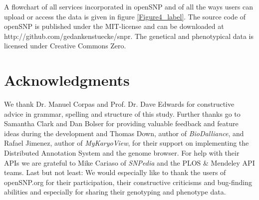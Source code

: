 \documentclass[10pt]{article}
\begin{document}
A flowchart of all services incorporated in openSNP and of all the ways users can upload or access the data is given in figure \ref{Figure4_label}. The source code of openSNP is 
published under the MIT-license and can be downloaded at http://github.com/gedankenstuecke/snpr. The genetical and phenotypical data is licensed under Creative Commons Zero. 
\section*{Acknowledgments}
We thank Dr. Manuel Corpas and Prof. Dr. Dave Edwards for constructive advice in grammar, spelling and structure of this study. Further thanks go to Samantha Clark and Dan Bolser for providing valuable feedback and feature ideas during the development and Thomas Down, author of \emph{BioDalliance}, and Rafael Jimenez, author of \emph{MyKaryoView}, for their support on implementing the Distributed Annotation System and the genome browser. For help with their APIs we are grateful to Mike Cariaso of \emph{SNPedia} and the PLOS \& Mendeley API teams. Last but not least: We would especially like to thank the users of openSNP.org for their participation, their constructive criticisms and bug-finding abilities and especially for sharing their genotyping and phenotype data.


\end{document}
